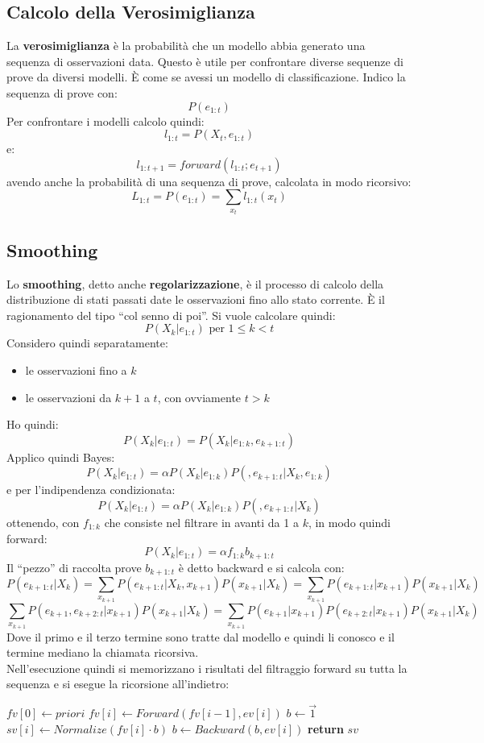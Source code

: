 \documentclass[a4paper,12pt, oneside]{book}
\begin{document}
\subsection{Calcolo della Verosimiglianza}
La \textbf{verosimiglianza} è la probabilità che un modello abbia generato una
sequenza di osservazioni data. Questo è utile per confrontare diverse sequenze
di prove da diversi modelli. È come se avessi un modello di
classificazione. Indico la sequenza di prove con: 
\[P(e_{1:t})\]
Per confrontare i modelli calcolo quindi:
\[l_{1:t}=P(X_t,e_{1:t})\]
e:
\[l_{1:t+1}=forward(l_{1:t};e_{t+1})\]
avendo anche la probabilità di una sequenza di prove, calcolata in modo
ricorsivo: 
\[L_{1:t}=P(e_{1:t})=\sum_{x_t}l_{1:t}(x_t)\]
\subsection{Smoothing}
Lo \textbf{smoothing}, detto anche \textbf{regolarizzazione}, è il processo di
calcolo della distribuzione di stati passati date le osservazioni fino allo
stato corrente. È il ragionamento del tipo ``col senno di poi''. Si vuole
calcolare quindi: 
\[P(X_k|e_{1:t})\mbox{ per } 1\leq k<t\]
Considero quindi separatamente:
\begin{itemize}
  \item le osservazioni fino a $k$
  \item le osservazioni da $k+1$ a $t$, con ovviamente $t>k$
\end{itemize}
Ho quindi:
\[P(X_k|e_{1:t})=P(X_k|e_{1:k},e_{k+1:t})\]
Applico quindi Bayes:
\[P(X_k|e_{1:t})=\alpha P(X_k|e_{1:k})P(,e_{k+1:t}|X_k,e_{1:k})\]
e per l'indipendenza condizionata:
\[P(X_k|e_{1:t})=\alpha P(X_k|e_{1:k})P(,e_{k+1:t}|X_k)\]
ottenendo, con $f_{1:k}$ che consiste nel filtrare in avanti da 1 a $k$, in modo
quindi forward:
\[P(X_k|e_{1:t})=\alpha f_{1:k}b_{k+1:t}\]
Il ``pezzo'' di raccolta prove $b_{k+1:t}$ è detto backward e si calcola con:
\[P(e_{k+1:t}|X_k)=\sum_{x_{k+1}}P(e_{k+1:t}|X_k,x_{k+1})P(x_{k+1}|X_k)=
  \sum_{x_{k+1}}P(e_{k+1:t}|x_{k+1})P(x_{k+1}|X_k)\]
\[\sum_{x_{k+1}}P(e_{k+1},e_{k+2:t}|x_{k+1})P(x_{k+1}|X_k)=
  \sum_{x_{k+1}}P(e_{k+1}|x_{k+1})P(e_{k+2:t}|x_{k+1})P(x_{k+1}|X_k)\]
Dove il primo e il terzo termine sono tratte dal modello e quindi li conosco e
il termine mediano la chiamata ricorsiva.\\
Nell'esecuzione quindi si memorizzano i risultati del filtraggio forward su
tutta la sequenza e si esegue la ricorsione all'indietro:
\begin{algorithm}[H]
  \begin{algorithmic}
    \State $fv[0]\gets priori$
    \State $fv[i]\gets Forward(fv[i-1], ev[i])$
    \EndFor
    \State $b\gets \vec{1}$
    \State $sv[i]\gets Normalize(fv[i]\cdot b)$
    \State $b\gets Backward(b, ev[i])$
    \EndFor
    \State \textbf{return} $sv$
    \EndFunction
  \end{algorithmic}
\end{algorithm}
\end{document}
